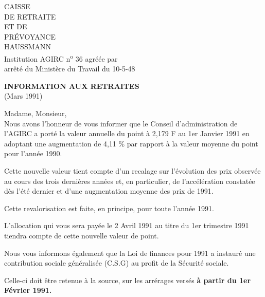 
CAISSE\\
DE RETRAITE\\
ET DE\\
PRÉVOYANCE\\
HAUSSMANN\\
Institution AGIRC n\textsuperscript{o} 36 agréée par\\
arrêté du Ministère du Travail du 10-5-48

\textbf{INFORMATION AUX RETRAITES}\\
(Mars 1991)

Madame, Monsieur,\\

Nous avons l'honneur de vous informer que le Conseil d'administration de l'AGIRC a porté la valeur annuelle du point à 2,179 F au 1er Janvier 1991 en adoptant une augmentation de 4,11 \% par rapport à la valeur moyenne du point pour l'année 1990.

Cette nouvelle valeur tient compte d'un recalage sur l'évolution des prix observée au cours des trois dernières années et, en particulier, de l'accélération constatée dès l'été dernier et d'une augmentation moyenne des prix de 1991.

Cette revalorisation est faite, en principe, pour toute l'année 1991.

L'allocation qui vous sera payée le 2 Avril 1991 au titre du 1er trimestre 1991 tiendra compte de cette nouvelle valeur de point.

Nous vous informons également que la Loi de finances pour 1991 a instauré une contribution sociale généralisée (C.S.G) au profit de la Sécurité sociale.

Celle-ci doit être retenue à la source, sur les arrérages versés \textbf{à partir du 1er Février 1991.}

